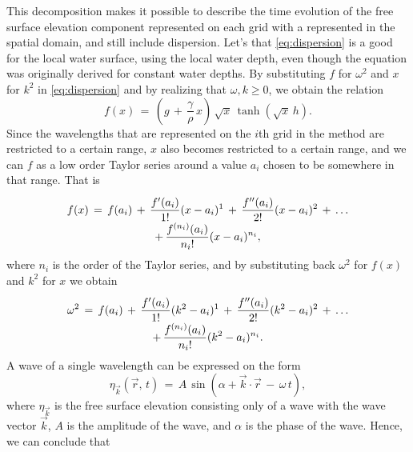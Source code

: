 This decomposition makes it possible to describe the time evolution of the free surface elevation component represented on each grid with a \PDE represented in the spatial domain, and still include dispersion. Let's \assume that \eqref{eq:dispersion} is a good \approximation for the local water surface, using the local water depth, even though the equation was originally derived for constant water depths. By substituting $f$ for $\omega^2$ and $x$ for $k^2$ in \eqref{eq:dispersion} and by realizing that $\omega, k \geq 0$, we obtain the relation
%
\begin{equation} \label{eq:dispersion_modified}
f(x) \,=\, \left(g\,+\,\frac{\gamma}{\rho}\,x\right)\,\sqrt{x}\,\tanh(\sqrt{x}\,h).
\end{equation}
%
Since the wavelengths that are represented on the $i$th grid in the method are restricted to a certain range, $x$ also becomes restricted to a certain range, and we can \approximate $f$ as a low order Taylor series around a value $a_i$ chosen to be somewhere in that range. That is
%
\begin{equation} \label{eq:dispersion_modified_taylor}
\renewcommand*{\arraystretch}{2}
\begin{array}{c}
\displaystyle f(x) \,=\, f(a_i) \,+\, \frac{f'(a_i)}{1!}(x-a_i)^1 \,+\, \frac{f''(a_i)}{2!}(x-a_i)^2 \,+\, \dots \\
\displaystyle +\, \frac{f^{(n_i)}(a_i)}{n_i!}(x-a_i)^{n_i},
\end{array}
\end{equation}
%
where $n_i$ is the order of the Taylor series, and by substituting back $\omega^2$ for $f(x)$ and $k^2$ for $x$ we obtain
%
\begin{equation} \label{eq:dispersion_taylor}
\renewcommand*{\arraystretch}{2}
\begin{array}{c}
\displaystyle \omega^2 \,=\, f(a_i) \,+\, \frac{f'(a_i)}{1!}(k^2-a_i)^1 \,+\, \frac{f''(a_i)}{2!}(k^2-a_i)^2 \,+\, \dots \\
\displaystyle +\, \frac{f^{(n_i)}(a_i)}{n_i!}(k^2-a_i)^{n_i}.
\end{array}
\end{equation}
%
A wave of a single wavelength can be expressed on the form
%
\begin{equation} \label{eq:component_sin}
\eta_{\vec{k}}(\vec{r},\,t) \,=\, A\,\sin(\alpha + \vec{k}\cdot\vec{r}\,-\,\omega\,t),
\end{equation}
%
where $\eta_{\vec{k}}$ is the free surface elevation consisting only of a wave with the wave vector $\vec{k}$, $A$ is the amplitude of the wave, and $\alpha$ is the phase of the wave. Hence, we can conclude that
